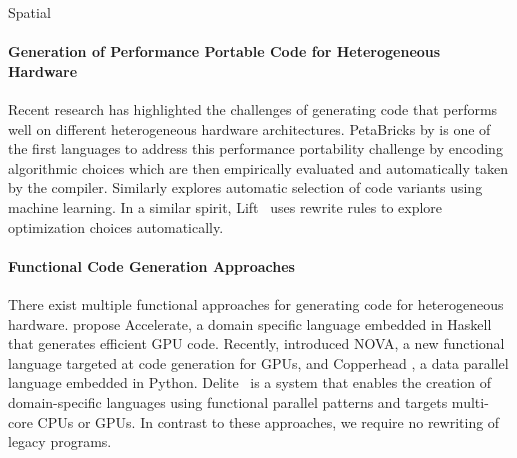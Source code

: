     Spatial \citet{Koeplinger:2018:SLC:3192366.3192379}

    \citet{Spampinato:2016:BLA:2854038.2854060}

\paragraph*{Generation of Performance Portable Code for Heterogeneous Hardware}
    Recent research has highlighted the challenges of generating code that
    performs well on different heterogeneous hardware architectures.
    PetaBricks by \citet{PhothilimthanaARA13} is one of the first languages to
    address this performance portability challenge by encoding algorithmic
    choices which are then empirically evaluated and automatically taken by the
    compiler.
    Similarly \cite{MuralidharanRHG16} explores automatic selection of code
    variants using machine learning.
    In a similar spirit, Lift~\cite{steuwer15rewrite} uses rewrite rules to
    explore optimization choices automatically.

\paragraph*{Functional Code Generation Approaches}
    There exist multiple functional approaches for generating code for
    heterogeneous hardware.
    \citet{chakravarty11accelerating,mcdonell13optimising} propose Accelerate,
    a domain specific language embedded in Haskell that generates efficient GPU
    code.
    Recently, \citet{collins14nova} introduced NOVA, a new functional language
    targeted at code generation for GPUs, and Copperhead
    \cite{catanzaro11copperhead}, a data parallel language embedded in Python.
    Delite~\cite{brown11heterogeneous,chafi11domain} is a system that enables
    the creation of domain-specific languages using functional parallel patterns
    and targets multi-core CPUs or GPUs.
    In contrast to these approaches, we require no rewriting of legacy programs.


